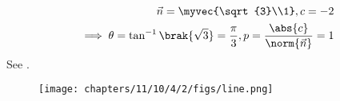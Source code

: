 		\begin{align}
	\vec{n}=\myvec{\sqrt{3}\\1},
			c=-2
			\\
			\implies
			\theta=\tan^{-1}\brak{\sqrt{3}}
			=\frac{\pi}{3},
			p=\frac{\abs{c}}{\norm{\vec{n}}}=1
		\end{align}
See .
\begin{figure}[H]
	\begin{center} 
	    \texttt{[image: chapters/11/10/4/2/figs/line.png]}
	\end{center}
\caption{}
\label{fig:chapters/11/10/4/2/Fig1}
\end{figure}

